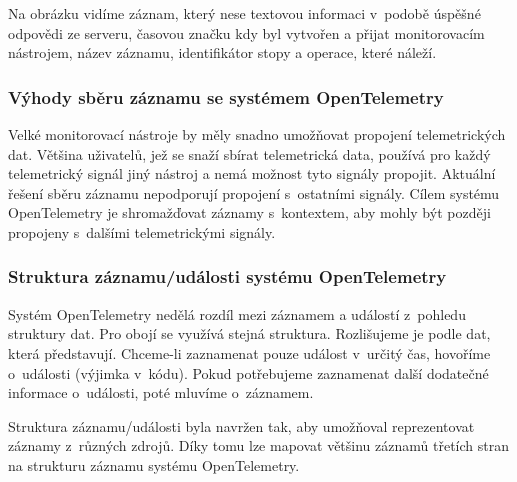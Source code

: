 
Na obrázku vidíme záznam, který nese textovou informaci v~podobě úspěšné odpovědi ze serveru, časovou značku kdy byl vytvořen a přijat monitorovacím nástrojem, název záznamu, identifikátor stopy a operace, které náleží.

\subsubsection{Výhody sběru záznamu se systémem OpenTelemetry}
Velké monitorovací nástroje by měly snadno umožňovat propojení telemetrických dat. Většina uživatelů, jež se snaží sbírat telemetrická data, používá pro každý telemetrický signál jiný nástroj a nemá možnost tyto signály propojit. Aktuální řešení sběru záznamu nepodporují propojení s~ostatními signály. Cílem systému OpenTelemetry je shromažďovat záznamy s~kontextem, aby mohly být později propojeny s~dalšími telemetrickými signály. \cite{SignozLog}

\subsubsection{Struktura záznamu/události systému OpenTelemetry}

Systém OpenTelemetry nedělá rozdíl mezi záznamem a událostí z~pohledu struktury dat. Pro obojí se využívá stejná struktura. Rozlišujeme je podle dat, která představují. Chceme-li zaznamenat pouze událost v~určitý čas, hovoříme o~události (výjimka v~kódu). Pokud potřebujeme zaznamenat další dodatečné informace o~události, poté mluvíme o~záznamem.


Struktura záznamu/události \cite{LogModel} byla navržen tak, aby umožňoval reprezentovat záznamy z~různých zdrojů. Díky tomu lze mapovat většinu záznamů třetích stran na strukturu záznamu systému OpenTelemetry. 

